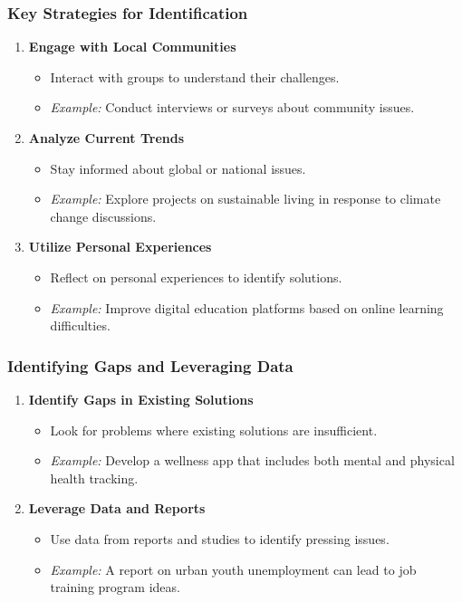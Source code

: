 \documentclass{beamer}
\begin{document}
\begin{frame}[fragile]
    \frametitle{Key Strategies for Identification}
    \begin{enumerate}
        \item \textbf{Engage with Local Communities}
        \begin{itemize}
            \item Interact with groups to understand their challenges.
            \item \textit{Example:} Conduct interviews or surveys about community issues.
        \end{itemize}

        \item \textbf{Analyze Current Trends}
        \begin{itemize}
            \item Stay informed about global or national issues.
            \item \textit{Example:} Explore projects on sustainable living in response to climate change discussions.
        \end{itemize}

        \item \textbf{Utilize Personal Experiences}
        \begin{itemize}
            \item Reflect on personal experiences to identify solutions.
            \item \textit{Example:} Improve digital education platforms based on online learning difficulties.
        \end{itemize}
    \end{enumerate}
\end{frame}

\begin{frame}[fragile]
    \frametitle{Identifying Gaps and Leveraging Data}
    \begin{enumerate}[resume]
        \item \textbf{Identify Gaps in Existing Solutions}
        \begin{itemize}
            \item Look for problems where existing solutions are insufficient.
            \item \textit{Example:} Develop a wellness app that includes both mental and physical health tracking.
        \end{itemize}
        
        \item \textbf{Leverage Data and Reports}
        \begin{itemize}
            \item Use data from reports and studies to identify pressing issues.
            \item \textit{Example:} A report on urban youth unemployment can lead to job training program ideas.
        \end{itemize}
    \end{enumerate}
\end{frame}
\end{document}
